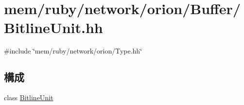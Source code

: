 \hypertarget{BitlineUnit_8hh}{
\section{mem/ruby/network/orion/Buffer/BitlineUnit.hh}
\label{BitlineUnit_8hh}
}
{\ttfamily \#include \char`\"{}mem/ruby/network/orion/Type.hh\char`\"{}}\par
\subsection*{構成}
\begin{DoxyCompactItemize}
\item 
class \hyperlink{classBitlineUnit}{BitlineUnit}
\end{DoxyCompactItemize}
